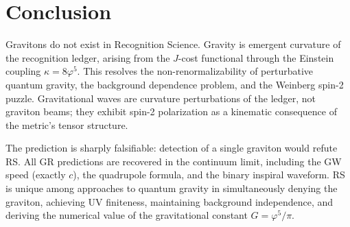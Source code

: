 \documentclass[12pt,a4paper]{article}
\theoremstyle{definition}
\theoremstyle{remark}
\begin{document}
\section{Conclusion}
\label{sec:conclusion}

Gravitons do not exist in Recognition Science.  Gravity is
emergent curvature of the recognition ledger, arising from the
$J$-cost functional through the Einstein coupling
$\kappa = 8\varphi^5$.  This resolves the
non-renormalizability of perturbative quantum gravity, the
background dependence problem, and the Weinberg spin-2 puzzle.
Gravitational waves are curvature perturbations of the ledger,
not graviton beams; they exhibit spin-2 polarization as a
kinematic consequence of the metric's tensor structure.

The prediction is sharply falsifiable: detection of a single
graviton would refute RS.  All GR predictions are recovered in
the continuum limit, including the GW speed (exactly $c$), the
quadrupole formula, and the binary inspiral waveform.  RS is
unique among approaches to quantum gravity in simultaneously
denying the graviton, achieving UV finiteness, maintaining
background independence, and deriving the numerical value of
the gravitational constant $G = \varphi^5/\pi$.
\end{document}
